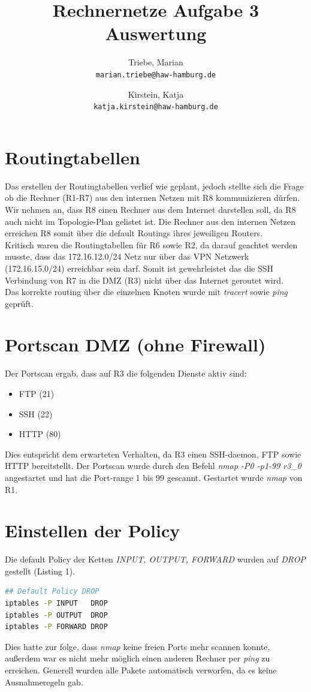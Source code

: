 \documentclass[a4paper,10pt]{article}
\title{Rechnernetze Aufgabe 3 Auswertung}
\author{
  Triebe, Marian\\
  \texttt{marian.triebe@haw-hamburg.de}
  \and
  Kirstein, Katja\\
  \texttt{katja.kirstein@haw-hamburg.de}
}
\begin{document}
\maketitle
\tableofcontents
\newpage

\section{Routingtabellen}
Das erstellen der Routingtabellen verlief wie geplant, jedoch stellte sich die Frage ob
die Rechner (R1-R7) aus den internen Netzen mit R8 kommunizieren dürfen. Wir nehmen an, dass R8
einen Rechner aus dem Internet darstellen soll, da R8 auch nicht im Topologie-Plan gelistet ist.
Die Rechner aus den internen Netzen erreichen R8 somit über die default Routings ihres jeweiligen Routers.\\
\newline
Kritisch waren die Routingtabellen für R6 sowie R2, da darauf geachtet werden musste, dass das 172.16.12.0/24 Netz
nur über das VPN Netzwerk (172.16.15.0/24) erreichbar sein darf. Somit ist gewehrleistet das die SSH Verbindung von R7
in die DMZ (R3) nicht über das Internet geroutet wird.\\
\newline
Das korrekte routing über die einzelnen Knoten wurde mit \textit{tracert} sowie \textit{ping} geprüft.

\section{Portscan DMZ (ohne Firewall)}
Der Portscan ergab, dass auf R3 die folgenden Dienste aktiv sind:
\begin{itemize}
 \item FTP (21)
 \item SSH (22)
 \item HTTP (80)
\end{itemize}
Dies entspricht dem erwarteten Verhalten, da R3 einen SSH-daemon, FTP sowie HTTP bereitstellt. Der Portscan wurde
durch den Befehl \textit{nmap -P0 -p1-99 r3\_0} angestartet und hat die Port-range 1 bis 99 gescannt. Gestartet wurde
\textit{nmap} von R1.

\section{Einstellen der Policy}
Die default Policy der Ketten \textit{INPUT, OUTPUT, FORWARD} wurden auf \textit{DROP} gestellt (Listing 1).
\begin{lstlisting}[language=bash,caption={Default Policy}]
## Default Policy DROP
iptables -P INPUT   DROP
iptables -P OUTPUT  DROP
iptables -P FORWARD DROP
\end{lstlisting}
Dies hatte zur folge, dass \textit{nmap} keine freien Ports mehr scannen konnte, außerdem war es nicht mehr möglich
einen anderen Rechner per \textit{ping} zu erreichen. Generell wurden alle Pakete automatisch verworfen, da es keine
Ausnahmeregeln gab.
\end{document}

